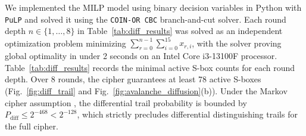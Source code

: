 \documentclass[10pt,twocolumn]{article}
\begin{document}
We implemented the MILP model using binary decision variables in Python with \texttt{PuLP} and solved it using the \texttt{COIN-OR CBC} branch-and-cut solver. Each round depth $n \in \{1, \dots, 8\}$ in Table~\ref{tab:diff_results} was solved as an independent optimization problem minimizing $\sum_{r=0}^{n-1} \sum_{i=0}^{15} x_{r,i}$, with the solver proving global optimality in under 2 seconds on an Intel Core i3-13100F processor. Table~\ref{tab:diff_results} records the minimal active S-box counts for each round depth. Over 8 rounds, the cipher guarantees at least 78 active S-boxes (Fig.~\ref{fig:diff_trail} and Fig.~\ref{fig:avalanche_diffusion}(b)). Under the Markov cipher assumption \cite{lai1991markov}, the differential trail probability is bounded by $P_{\text{diff}} \le 2^{-468} < 2^{-128}$, which strictly precludes differential distinguishing trails for the full cipher.

\begin{table}[htbp]
\caption{Active S-box lower bound scan (differential cryptanalysis)}
\label{tab:diff_results}
\centering
{}
\end{table}
\end{document}
